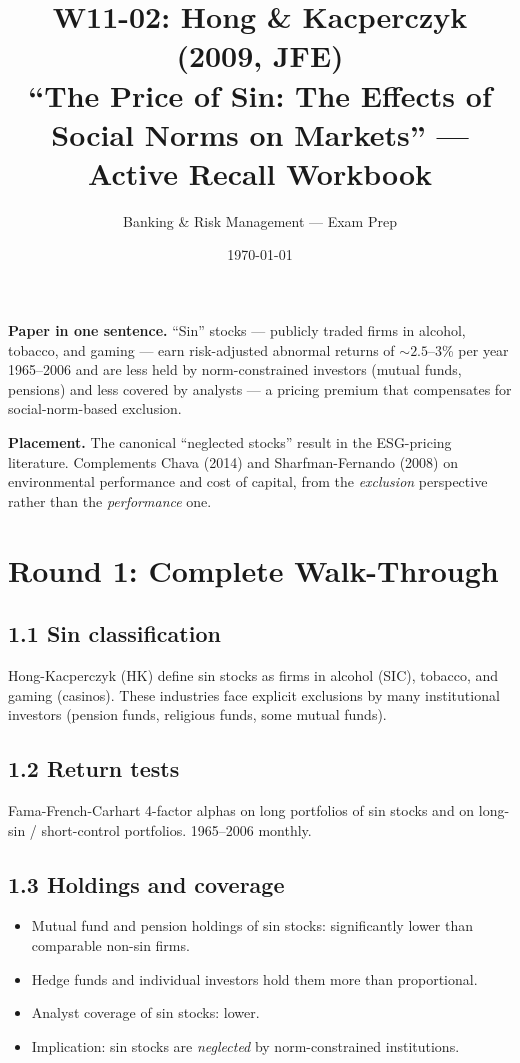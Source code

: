 \documentclass[11pt]{article}
\title{W11-02: Hong \& Kacperczyk (2009, JFE) \\
\large ``The Price of Sin: The Effects of Social Norms on Markets'' --- Active Recall Workbook}
\author{Banking \& Risk Management --- Exam Prep}
\date{\today}
\begin{document}
\maketitle

\begin{keybox}
\textbf{Paper in one sentence.} ``Sin'' stocks --- publicly traded firms in alcohol, tobacco, and gaming --- earn risk-adjusted abnormal returns of $\sim 2.5$--$3$\% per year 1965--2006 and are less held by norm-constrained investors (mutual funds, pensions) and less covered by analysts --- a pricing premium that compensates for social-norm-based exclusion.

\textbf{Placement.} The canonical ``neglected stocks'' result in the ESG-pricing literature. Complements Chava (2014) and Sharfman-Fernando (2008) on environmental performance and cost of capital, from the \emph{exclusion} perspective rather than the \emph{performance} one.
\end{keybox}

\section*{Round 1: Complete Walk-Through}

\subsection*{1.1 Sin classification}
Hong-Kacperczyk (HK) define sin stocks as firms in alcohol (SIC), tobacco, and gaming (casinos). These industries face explicit exclusions by many institutional investors (pension funds, religious funds, some mutual funds).

\subsection*{1.2 Return tests}
Fama-French-Carhart 4-factor alphas on long portfolios of sin stocks and on long-sin / short-control portfolios. 1965--2006 monthly.

\subsection*{1.3 Holdings and coverage}
\begin{itemize}
\item Mutual fund and pension holdings of sin stocks: significantly lower than comparable non-sin firms.
\item Hedge funds and individual investors hold them more than proportional.
\item Analyst coverage of sin stocks: lower.
\item Implication: sin stocks are \emph{neglected} by norm-constrained institutions.
\end{itemize}
\end{document}
